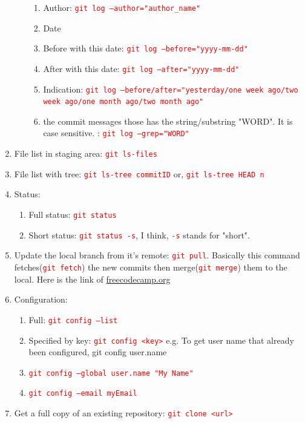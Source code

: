 \documentclass[12 pt, letterpaper]{extarticle}
\newcommand{\R}{\textcolor{red}} %
\newcommand{\T}{\texttt}
\begin{document}
\begin{enumerate}
\begin{enumerate}
		            \begin{enumerate}
			            \item Author: \R{\T{git log --author="author\_name"}}
			            \item Date
			            \item Before with this date: \R{\T{git log --before="yyyy-mm-dd"}}
			            \item After with this date: \R{\T{git log --after="yyyy-mm-dd"}}
			            \item Indication: \R{\T{git log --before/after="yesterday/one week ago/two week ago/one month ago/two month ago"}}
			            \item the commit messages those has the string/substring "WORD". It is case sensitive. : \R{\T{git log --grep="WORD"}}
		            \end{enumerate}
	      \end{enumerate}
	\item File list in staging area: \R{\T{git ls-files}}
	\item File list with tree: \R{\T{git ls-tree commitID}}	or, \R{\T{git ls-tree HEAD~n}}

	\item Status:
	      \begin{enumerate}
		      \item Full status: \R{\T{git status}}
		      \item Short status: \R{\T{git status -s}}, I think, \R{\T{-s}} stands for "short".
	      \end{enumerate}

	\item Update the local branch from it's remote: \R{\T{git pull}}. Basically this command fetches(\R{\T{git fetch}}) the new commits then merge(\R{\T{git merge}}) them to the local. Here is the link of \href{https://www.freecodecamp.org/news/git-pull-explained/#:~:text=git\%20pull\%20is\%20a\%20Git,a\%20repository\%20from\%20a\%20remote.&text=By\%20default\%2C\%20git\%20pull\%20does,branches\%20for\%20all\%20other\%20branches.}{freecodecamp.org}

	\item Configuration:
	      \begin{enumerate}
		      \item Full: \R{\T{git config --list}}
		      \item Specified by key: \R{\T{git config <key>}} e.g. To get user name that already been configured, \textcolor{red!70}{{git config user.name}}
		      \item \R{\T{git config --global user.name "My Name"}}
		      \item \R{\T{git config --email myEmail}}
	      \end{enumerate}
	\item Get a full copy of an existing repository: \R{\T{git clone <url>}}


\end{enumerate}
\end{document}
